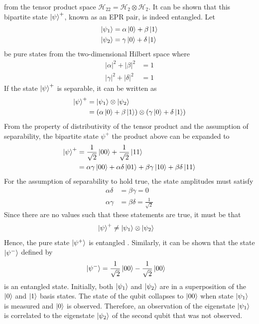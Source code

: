from the tensor product space $\mathcal{H}_{22} = \mathcal{H}_{2}\otimes\mathcal{H}_2$. It can be shown that this bipartite state $\ket{\psi}^+$, known as an EPR pair, is indeed entangled. Let
\begin{align}
	\ket{\psi_1}	& = \alpha\ket{0} + \beta\ket{1}\nonumber\\
	\ket{\psi_2} 	& = \gamma\ket{0} + \delta\ket{1}\nonumber
\end{align} 
be pure states from the two-dimensional Hilbert space where
\begin{align}
	|\alpha|^2 + |\beta|^2 & = 1\nonumber\\
	|\gamma|^2 + |\delta|^2 & = 1\nonumber
\end{align}
If the state $\ket{\psi}^+$ is separable, it can be written as
\begin{align}
	\ket{\psi}^+	& = \ket{\psi_1}	\otimes		\ket{\psi_2}\nonumber\\
					& = (\alpha\ket{0} + \beta\ket{1})\otimes(\gamma\ket{0} + \delta\ket{1})\nonumber
\end{align}
From the property of distributivity of the tensor product and the assumption of separability, the bipartite state $\psi^{+}$ the product above can be expanded to
\begin{align}
	\ket{\psi}^+	& = \frac{1}{\sqrt{2}}\ket{00}+\frac{1}{\sqrt{2}}\ket{11}\nonumber\\
					& = \alpha\gamma\ket{00} + \alpha\delta\ket{01} + \beta\gamma\ket{10} + \beta\delta\ket{11}\nonumber 
\end{align}
For the assumption of separability to hold true, the state amplitudes must satisfy
\begin{align}
	\alpha\delta&=\beta\gamma=0\nonumber\\
	\alpha\gamma&=\beta\delta=\frac{1}{\sqrt{2}}\nonumber
\end{align}
Since there are no values such that these statements are true, it must be that 
\begin{align}
	\ket{\psi}^+	& \neq \ket{\psi_1}\otimes\ket{\psi_2}\nonumber
\end{align}
Hence, the pure state $\ket{\psi^+}$ is entangled \cite{Kurzyk2012}. Similarly, it can be shown that the state $\ket{\psi^-}$ defined by
\begin{align}
	\ket{\psi^-}	& =  \frac{1}{\sqrt{2}}\ket{00}-\frac{1}{\sqrt{2}}\ket{00}\nonumber
\end{align}
is an entangled state.   Initially, both $\ket{\psi_1}$ and $\ket{\psi_2}$ are in a superposition of the $\ket{0}$ and $\ket{1}$ basis states. The state of the qubit collapses to $\ket{00}$ when state $\ket{\psi_1}$ is measured and $\ket{0}$ is observed. Therefore, an observation of the eigenstate $\ket{\psi_1}$ is correlated to the eigenstate $\ket{\psi_2}$ of the second qubit that was not observed.
